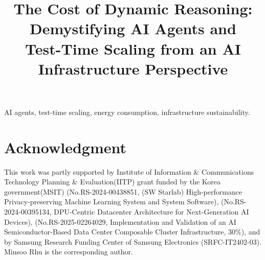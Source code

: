 \documentclass[conference]{IEEEtran}
\begin{document}
\title{\huge The Cost of Dynamic Reasoning: Demystifying AI Agents and \\Test-Time Scaling from an AI Infrastructure Perspective
}

\author{
\and
{}
\and
{}
\and
{}
}


\maketitle



\begin{IEEEkeywords}
AI agents, test-time scaling, energy consumption, infrastructure sustainability.
\end{IEEEkeywords}










\section*{Acknowledgment}
This work was partly supported by Institute of Information \& Communications Technology Planning \& Evaluation(IITP) grant funded by the Korea government(MSIT) (No.RS-2024-00438851, (SW Starlab) High-performance Privacy-preserving Machine Learning System and System Software), (No.RS-2024-00395134, DPU-Centric Datacenter Architecture for Next-Generation AI Devices), (No.RS-2025-02264029, Implementation and Validation of an AI Semiconductor-Based Data Center Composable Cluster Infrastructure, 30\%), and by Samsung Research Funding Center of Samsung Electronics (SRFC-IT2402-03). Minsoo Rhu is the corresponding author.



\end{document}
